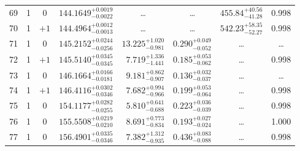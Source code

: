 \begin{table*}[!]
\begin{tabular}{llcrrlrc}
69 & 1 & 0 & $    144.1649_{-      0.0022}^{+      0.0019}$ & \multicolumn{1}{c}{\dots} & \multicolumn{1}{c}{\dots} & $      455.84_{-       41.28}^{+       40.56}$ & 0.998\\[1pt]
70 & 1 & $+1$ & $    144.4964_{-      0.0013}^{+      0.0012}$ & \multicolumn{1}{c}{\dots} & \multicolumn{1}{c}{\dots} & $      542.23_{-       52.27}^{+       58.35}$ & 0.998\\[1pt]
71 & 1 & 0 & $    145.2152_{-      0.0256}^{+      0.0244}$ & $      13.225_{-       0.981}^{+       1.020}$ & $       0.290_{-       0.052}^{+       0.049}$ & \multicolumn{1}{c}{\dots} & \dots \\[1pt]
72 & 1 & $+1$ & $    145.5140_{-      0.0345}^{+      0.0345}$ & $       7.719_{-       1.441}^{+       1.336}$ & $       0.185_{-       0.062}^{+       0.053}$ & \multicolumn{1}{c}{\dots} & 0.998\\[1pt]
73 & 1 & 0 & $    146.1664_{-      0.0181}^{+      0.0166}$ & $       9.181_{-       0.907}^{+       0.862}$ & $       0.136_{-       0.037}^{+       0.032}$ & \multicolumn{1}{c}{\dots} & \dots \\[1pt]
74 & 1 & $+1$ & $    146.4116_{-      0.0346}^{+      0.0302}$ & $       7.682_{-       0.966}^{+       0.994}$ & $       0.199_{-       0.064}^{+       0.053}$ & \multicolumn{1}{c}{\dots} & 0.998\\[1pt]

75 & 1 & 0 & $    154.1177_{-      0.0255}^{+      0.0282}$ & $       5.810_{-       0.688}^{+       0.641}$ & $       0.223_{-       0.039}^{+       0.036}$ & \multicolumn{1}{c}{\dots} & 0.998\\[1pt]
76 & 1 & 0 & $    155.5508_{-      0.0210}^{+      0.0219}$ & $       8.691_{-       0.834}^{+       0.773}$ & $       0.193_{-       0.024}^{+       0.027}$ & \multicolumn{1}{c}{\dots} & 1.000\\[1pt]
77 & 1 & 0 & $    156.4901_{-      0.0346}^{+      0.0335}$ & $       7.382_{-       0.935}^{+       1.312}$ & $       0.436_{-       0.088}^{+       0.083}$ & \multicolumn{1}{c}{\dots} & 0.998\\[1pt]
\hline
\end{tabular}
\end{table*}


